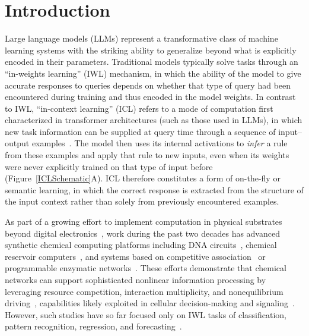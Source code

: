 \documentclass[%
reprint,
superscriptaddress,
amsmath,amssymb,
aps,
]{revtex4-2}
\begin{document}
	\maketitle
	
	
	
	
	\section{Introduction}
	
	
	Large language models (LLMs) represent a transformative class of machine learning systems with the striking ability to generalize beyond what is explicitly encoded in their parameters. Traditional models typically solve tasks through an ``in-weights learning'' (IWL) mechanism, in which the ability of the model to give accurate responses to queries depends on whether that type of query had been encountered during training and thus encoded in the model weights.  In contrast to IWL, ``in-context learning'' (ICL) refers to a mode of computation first characterized in transformer architectures (such as those used in LLMs), in which new task information can be supplied at query time through a sequence of input–output examples~\cite{brown2020language,dong2024survey,reddy2023mechanistic,nguyen2024differential,chan2022data}. The model then uses its internal activations to \emph{infer} a rule from these examples and apply that rule to new inputs, even when its weights were never explicitly trained on that type of input before (Figure~\ref{ICLSchematic}A). ICL therefore constitutes a form of on-the-fly or semantic learning, in which the correct response is extracted from the structure of the input context rather than solely from previously encountered examples.
	
	As part of a growing effort to implement computation in physical substrates beyond digital electronics~\cite{stern2023learning}, work during the past two decades has advanced synthetic chemical computing platforms including DNA circuits~\cite{vasle2024synthetic,seelig2006enzyme,qian2011neural,cherry2018scaling,cherry2025supervised,okumura2022nonlinear}, chemical reservoir computers~\cite{baltussen2024chemical,ghosh2025recursive}, and systems based on competitive association~\cite{evans2024pattern,chen2024synthetic} or programmable enzymatic networks~\cite{gao2018programmable,yang2025engineering}. These efforts demonstrate that chemical networks can support sophisticated nonlinear information processing by leveraging resource competition, interaction multiplicity, and nonequilibrium driving~\cite{hjelmfelt1991chemical,maass2000computational,genot2012computing,zhong2017associative,klumpe2023computational,parres2025contextual,floyd2025limits}, capabilities likely exploited in cellular decision-making and signaling~\cite{su2022ligand,lim2024cell}. However, such studies have so far focused only on IWL tasks of classification, pattern recognition, regression, and forecasting~\cite{floyd2025limits,evans2024pattern,kieffer2023molecular,dack2024recurrent,baltussen2024chemical,ghosh2025recursive}.
	
\end{document}
